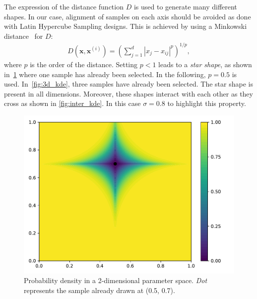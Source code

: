 The expression of the distance function $D$ is used to generate many different shapes. In our case, alignment of samples on each axis should be avoided as done with Latin Hypercube Sampling designs. This is achieved by using a Minkowski distance~\citep{Cha2007} for $D$:
\begin{align}
D\left(\mathbf{x},\mathbf{x}^{(i)}\right)=\left(\sum_{j=1}^d |x_{j}-x_{ij}|^p\right)^{1/p},
\end{align}
where $p$ is the order of the distance. Setting $p < 1$ leads to a \emph{star shape}, as shown in~\cref{fig:minkowsky} where one sample has already been selected. In the following, $p=0.5$ is used. In~\cref{fig:3d_kde}, three samples have already been selected. The star shape is present in all dimensions. Moreover, these shapes interact with each other as they cross as shown in \cref{fig:inter_kde}. In this case $\sigma=0.8$ to highlight this property.

\cleardoublepage

\begin{figure}[!ht]               
\centering
\includegraphics[width=0.7\linewidth,height=\textheight,keepaspectratio]{fig/contributions/doe/inv_minkowsky.pdf}
\caption{Probability density in a 2-dimensional parameter space. \emph{Dot} represents the sample already drawn at (0.5, 0.7).}
 \label{fig:minkowsky}
\end{figure}

